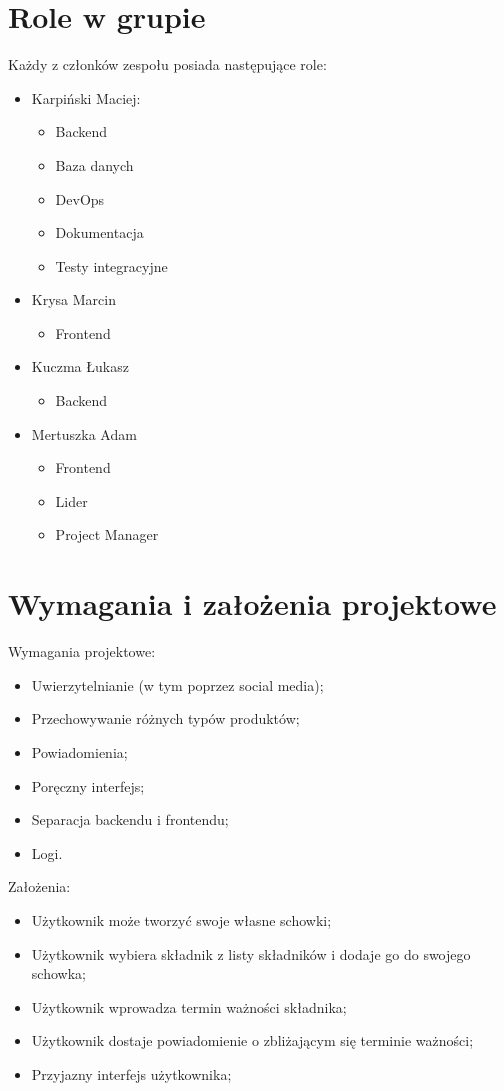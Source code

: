 \documentclass[12pt,a4paper]{article}
\begin{document}
	\section{Role w grupie}
	\indent Każdy z członków zespołu posiada następujące role:
	\begin{itemize}
		\item Karpiński Maciej:
			\begin{itemize}
				\item Backend
				\item Baza danych
				\item DevOps
				\item Dokumentacja
				\item Testy integracyjne
			\end{itemize}
		\item Krysa Marcin
			\begin{itemize}
				\item Frontend
			\end{itemize}
		\item Kuczma Łukasz
			\begin{itemize}
				\item Backend
			\end{itemize}
		\item Mertuszka Adam
			\begin{itemize}
				\item Frontend
				\item Lider
				\item Project Manager
			\end{itemize}
	\end{itemize}		
	\newpage
	
	\section{Wymagania i założenia projektowe}
		Wymagania projektowe:
		\begin{itemize}
			\item Uwierzytelnianie (w tym poprzez social media);
			\item Przechowywanie różnych typów produktów;
			\item Powiadomienia;
			\item Poręczny interfejs;
			\item Separacja backendu i frontendu;
			\item Logi.
		\end{itemize}
		Założenia:
		\begin{itemize}
			\item Użytkownik może tworzyć swoje własne schowki;
			\item Użytkownik wybiera składnik z listy składników i dodaje go do swojego schowka;
			\item Użytkownik wprowadza termin ważności składnika;
			\item Użytkownik dostaje powiadomienie o zbliżającym się terminie ważności;
			\item Przyjazny interfejs użytkownika;
		\end{itemize}				 
	\newpage
	
\end{document}
